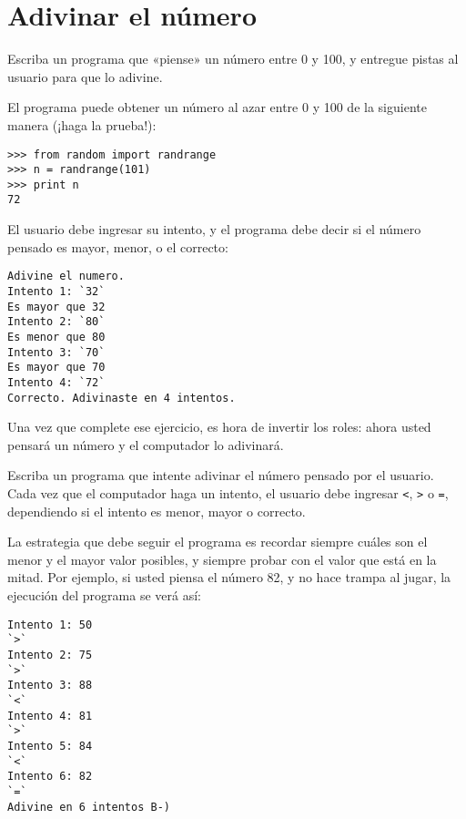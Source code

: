 \section{Adivinar el número}

Escriba un programa que «piense» un número entre 0 y 100, y entregue
pistas al usuario para que lo adivine.

El programa puede obtener un número al azar entre 0 y 100 de la
siguiente manera (¡haga la prueba!):

\begin{lstlisting}
>>> from random import randrange
>>> n = randrange(101)
>>> print n
72
\end{lstlisting}

El usuario debe ingresar su intento, y el programa debe decir si el
número pensado es mayor, menor, o el correcto:
\begin{lstlisting}[language=testcase]
Adivine el numero.
Intento 1: `32`
Es mayor que 32
Intento 2: `80`
Es menor que 80
Intento 3: `70`
Es mayor que 70
Intento 4: `72`
Correcto. Adivinaste en 4 intentos.
\end{lstlisting}

Una vez que complete ese ejercicio, es hora de invertir los roles: ahora
usted pensará un número y el computador lo adivinará.

Escriba un programa que intente adivinar el número pensado por el
usuario. Cada vez que el computador haga un intento, el usuario debe
ingresar \lstinline!<!, \lstinline!>! o \lstinline!=!, dependiendo si el
intento es menor, mayor o correcto.

La estrategia que debe seguir el programa es recordar siempre cuáles son
el menor y el mayor valor posibles, y siempre probar con el valor que
está en la mitad. Por ejemplo, si usted piensa el número 82, y no hace
trampa al jugar, la ejecución del programa se verá así:

\begin{lstlisting}[language=testcase]
Intento 1: 50
`>`
Intento 2: 75
`>`
Intento 3: 88
`<`
Intento 4: 81
`>`
Intento 5: 84
`<`
Intento 6: 82
`=`
Adivine en 6 intentos B-)
\end{lstlisting}


